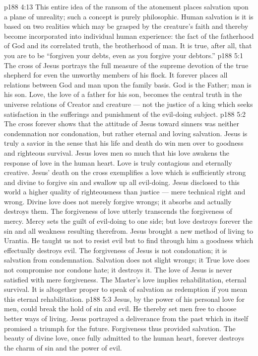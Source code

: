 \vs p188 4:13 This entire idea of the ransom of the atonement places salvation upon a plane of unreality; such a concept is purely philosophic. Human salvation is  it is based on two realities which may be grasped by the creature’s faith and thereby become incorporated into individual human experience: the fact of the fatherhood of God and its correlated truth, the brotherhood of man. It is true, after all, that you are to be \textcolor{ubdarkred}{“forgiven your debts, even as you forgive your debtors.”}
\vs p188 5:1 The cross of Jesus portrays the full measure of the supreme devotion of the true shepherd for even the unworthy members of his flock. It forever places all relations between God and man upon the family basis. God is the Father; man is his son. Love, the love of a father for his son, becomes the central truth in the universe relations of Creator and creature --- not the justice of a king which seeks satisfaction in the sufferings and punishment of the evil\hyp{}doing subject.
\vs p188 5:2 The cross forever shows that the attitude of Jesus toward sinners was neither condemnation nor condonation, but rather eternal and loving salvation. Jesus is truly a savior in the sense that his life and death do win men over to goodness and righteous survival. Jesus loves men so much that his love awakens the response of love in the human heart. Love is truly contagious and eternally creative. Jesus’ death on the cross exemplifies a love which is sufficiently strong and divine to forgive sin and swallow up all evil\hyp{}doing. Jesus disclosed to this world a higher quality of righteousness than justice --- mere technical right and wrong. Divine love does not merely forgive wrongs; it absorbs and actually destroys them. The forgiveness of love utterly transcends the forgiveness of mercy. Mercy sets the guilt of evil\hyp{}doing to one side; but love destroys forever the sin and all weakness resulting therefrom. Jesus brought a new method of living to Urantia. He taught us not to resist evil but to find through him a goodness which effectually destroys evil. The forgiveness of Jesus is not condonation; it is salvation from condemnation. Salvation does not slight wrongs; it  True love does not compromise nor condone hate; it destroys it. The love of Jesus is never satisfied with mere forgiveness. The Master’s love implies rehabilitation, eternal survival. It is altogether proper to speak of salvation as redemption if you mean this eternal rehabilitation.
\vs p188 5:3 Jesus, by the power of his personal love for men, could break the hold of sin and evil. He thereby set men free to choose better ways of living. Jesus portrayed a deliverance from the past which in itself promised a triumph for the future. Forgiveness thus provided salvation. The beauty of divine love, once fully admitted to the human heart, forever destroys the charm of sin and the power of evil.
